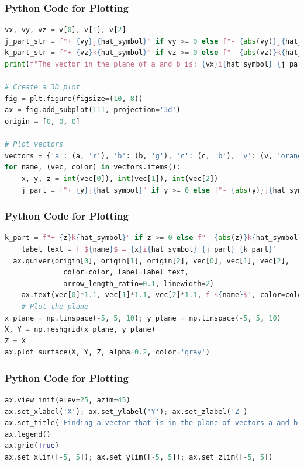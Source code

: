 \documentclass{beamer}
\theoremstyle{remark}
\numberwithin{equation}{section}
\begin{document}
\begin{frame}[fragile]
\frametitle{Python Code for Plotting}
\begin{lstlisting}[language=Python]
vx, vy, vz = v[0], v[1], v[2]
j_part_str = f"+ {vy}j{hat_symbol}" if vy >= 0 else f"- {abs(vy)}j{hat_symbol}"
k_part_str = f"+ {vz}k{hat_symbol}" if vz >= 0 else f"- {abs(vz)}k{hat_symbol}"
print(f"The vector in the plane of a and b is: {vx}i{hat_symbol} {j_part_str} {k_part_str}")

# Create a 3D plot
fig = plt.figure(figsize=(10, 8))
ax = fig.add_subplot(111, projection='3d')
origin = [0, 0, 0]

# Plot vectors
vectors = {'a': (a, 'r'), 'b': (b, 'g'), 'c': (c, 'b'), 'v': (v, 'orange')}
for name, (vec, color) in vectors.items():
    x, y, z = int(vec[0]), int(vec[1]), int(vec[2])
    j_part = f"+ {y}j{hat_symbol}" if y >= 0 else f"- {abs(y)}j{hat_symbol}"
\end{lstlisting}
\end{frame}

\begin{frame}[fragile]
\frametitle{Python Code for Plotting}
\begin{lstlisting}[language=Python]
    k_part = f"+ {z}k{hat_symbol}" if z >= 0 else f"- {abs(z)}k{hat_symbol}"
    label_text = f'${name}$ = {x}i{hat_symbol} {j_part} {k_part}'
  ax.quiver(origin[0], origin[1], origin[2], vec[0], vec[1], vec[2],
              color=color, label=label_text,
              arrow_length_ratio=0.1, linewidth=2)
    ax.text(vec[0]*1.1, vec[1]*1.1, vec[2]*1.1, f'${name}$', color=color, fontsize=15)
    # Plot the plane
x_plane = np.linspace(-5, 5, 10); y_plane = np.linspace(-5, 5, 10)
X, Y = np.meshgrid(x_plane, y_plane)
Z = X
ax.plot_surface(X, Y, Z, alpha=0.2, color='gray')

\end{lstlisting}
\end{frame}

\begin{frame}[fragile]
\frametitle{Python Code for Plotting}
\begin{lstlisting}[language=Python]
ax.view_init(elev=25, azim=45)
ax.set_xlabel('X'); ax.set_ylabel('Y'); ax.set_zlabel('Z')
ax.set_title('Finding a vector that is in the plane of vectors a and b')
ax.legend()
ax.grid(True)
ax.set_xlim([-5, 5]); ax.set_ylim([-5, 5]); ax.set_zlim([-5, 5])
\end{lstlisting}
\end{frame}
\end{document}
